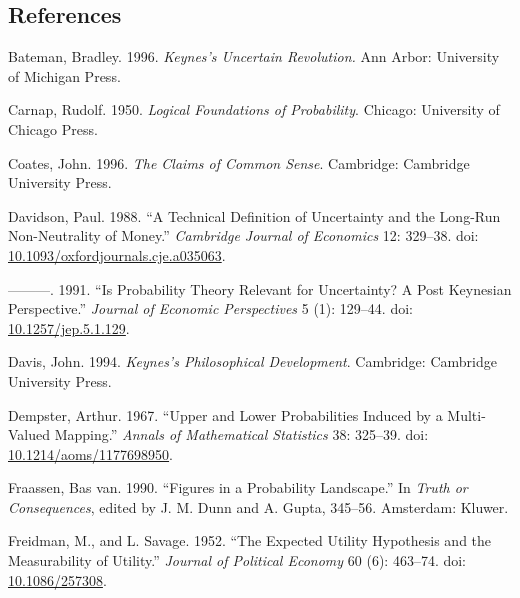 \documentclass[
  10pt,
  letterpaper,
  DIV=11,
  numbers=noendperiod,
  twoside]{scrartcl}
\newlength{\cslhangindent}
\newenvironment{CSLReferences}[2] %
 {\begin{list}{}{%
  \setlength{\itemindent}{0pt}
  \setlength{\leftmargin}{0pt}
  \setlength{\parsep}{0pt}
  \ifodd #1
   \setlength{\leftmargin}{\cslhangindent}
   \setlength{\itemindent}{-1\cslhangindent}
  \fi
  \setlength{\itemsep}{#2\baselineskip}}}
 {\end{list}}
\begin{document}
\subsection*{References}\label{references}

\label{refs}
\begin{CSLReferences}{1}{0}
Bateman, Bradley. 1996. \emph{Keynes's Uncertain Revolution.} Ann Arbor:
University of Michigan Press.

Carnap, Rudolf. 1950. \emph{Logical Foundations of Probability}.
Chicago: University of Chicago Press.

Coates, John. 1996. \emph{The Claims of Common Sense}. Cambridge:
Cambridge University Press.

Davidson, Paul. 1988. {``A Technical Definition of Uncertainty and the
Long-Run Non-Neutrality of Money.''} \emph{Cambridge Journal of
Economics} 12: 329--38. doi:
\href{https://doi.org/10.1093/oxfordjournals.cje.a035063}{10.1093/oxfordjournals.cje.a035063}.

---------. 1991. {``Is Probability Theory Relevant for Uncertainty? A
Post Keynesian Perspective.''} \emph{Journal of Economic Perspectives} 5
(1): 129--44. doi:
\href{https://doi.org/10.1257/jep.5.1.129}{10.1257/jep.5.1.129}.

Davis, John. 1994. \emph{Keynes's Philosophical Development}. Cambridge:
Cambridge University Press.

Dempster, Arthur. 1967. {``Upper and Lower Probabilities Induced by a
Multi-Valued Mapping.''} \emph{Annals of Mathematical Statistics} 38:
325--39. doi:
\href{https://doi.org/10.1214/aoms/1177698950}{10.1214/aoms/1177698950}.

Fraassen, Bas van. 1990. {``Figures in a Probability Landscape.''} In
\emph{Truth or Consequences}, edited by J. M. Dunn and A. Gupta,
345--56. Amsterdam: Kluwer.

Freidman, M., and L. Savage. 1952. {``The Expected Utility Hypothesis
and the Measurability of Utility.''} \emph{Journal of Political Economy}
60 (6): 463--74. doi:
\href{https://doi.org/10.1086/257308}{10.1086/257308}.


\end{CSLReferences}
\end{document}
